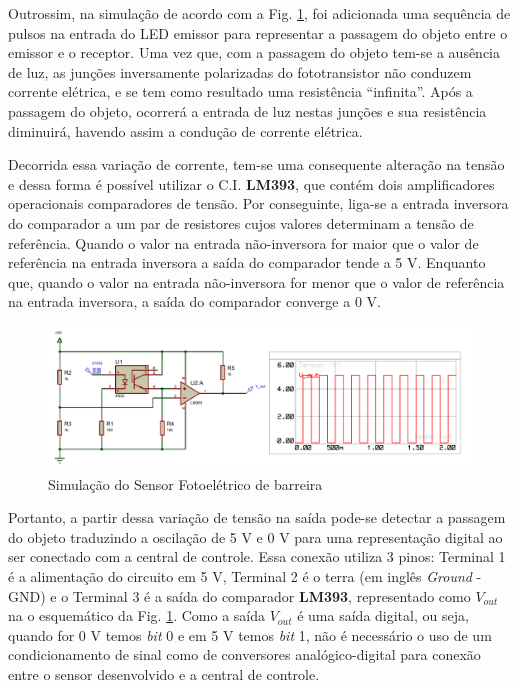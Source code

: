     Outrossim, na simulação de acordo com a Fig. \ref{fig:sim_sensor_barreira}, foi adicionada uma sequência de pulsos na entrada do LED emissor para representar a passagem do objeto entre o emissor e o receptor. Uma vez que, com a passagem do objeto tem-se a ausência de luz, as junções inversamente polarizadas do fototransistor não conduzem corrente elétrica, e se tem como resultado uma resistência ``infinita''. Após a passagem do objeto, ocorrerá a entrada de luz nestas junções e sua resistência diminuirá, havendo assim a condução de corrente elétrica. 
    
    Decorrida essa variação de corrente, tem-se uma consequente alteração na tensão e dessa forma é possível utilizar o C.I. \textbf{LM393}, que contém dois amplificadores operacionais comparadores de tensão. Por conseguinte, liga-se a entrada inversora do comparador a um par de resistores cujos valores determinam a tensão de referência. Quando o valor na entrada não-inversora for maior que o valor de referência na entrada inversora a saída do comparador tende a 5 V. Enquanto que, quando o valor na entrada não-inversora for menor que o valor de referência na entrada inversora, a saída do comparador converge a 0 V. 
    
    \begin{figure}[H]
    \centering
    \includegraphics[scale=0.65]{figuras/eletronica/esquematicos/sensor_barreira/Sim_sensor_barreir_3.PDF}
    \caption{Simulação do Sensor Fotoelétrico de barreira}
    \label{fig:sim_sensor_barreira}
    \end{figure}
    
     Portanto, a partir dessa variação de tensão na saída pode-se detectar a passagem do objeto traduzindo a oscilação de 5 V e 0 V para uma representação digital ao ser conectado com a central de controle. Essa conexão utiliza 3 pinos: Terminal 1 é a alimentação do circuito em 5 V, Terminal 2 é o terra (em inglês \textit{Ground} - GND) e o Terminal 3 é a saída do comparador \textbf{LM393}, representado como $V_{out}$ na o esquemático da Fig. \ref{fig:sim_sensor_barreira}. Como a saída $V_{out}$ é uma saída digital, ou seja, quando for 0 V temos \textit{bit} 0 e em 5 V temos \textit{bit} 1, não é necessário o uso de um condicionamento de sinal como de conversores analógico-digital para conexão entre o sensor desenvolvido e a central de controle.

